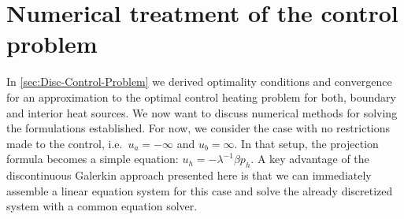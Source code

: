 \documentclass[../thesis.tex]{subfiles}
\begin{document}
\chapter{Numerical treatment of the control problem}
\label{sec:st-numerics}
In \cref{sec:Disc-Control-Problem} we derived optimality conditions and convergence for an approximation to the optimal control heating problem for both, boundary and interior heat sources.
We now want to discuss numerical methods for solving the formulations established.
For now, we consider the case with no restrictions made to the control, i.e.\ $u_a = -\infty$ and $u_b = \infty$. In that setup, the projection formula becomes a simple equation: $u_h = - \lambda^{-1} \beta p_h$.
A key advantage of the discontinuous Galerkin approach presented here is that we can immediately assemble a linear equation system for this case and solve the already discretized system with a common equation solver.
\end{document}
